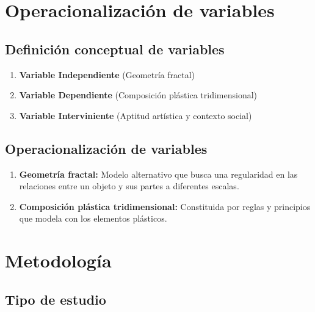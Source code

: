 \documentclass[12pt,]{report}
\providecommand{\tightlist}{%
  \setlength{\itemsep}{0pt}\setlength{\parskip}{0pt}}
\begin{document}
\hypertarget{operacionalizaciuxf3n-de-variables}{%
\section{Operacionalización de variables}\label{operacionalizaciuxf3n-de-variables}}

\hypertarget{definiciuxf3n-conceptual-de-variables}{%
\subsection{Definición conceptual de variables}\label{definiciuxf3n-conceptual-de-variables}}

\begin{enumerate}
\def\labelenumi{\arabic{enumi}.}
\item
  \textbf{Variable Independiente} (Geometría fractal)
\item
  \textbf{Variable Dependiente} (Composición plástica tridimensional)
\item
  \textbf{Variable Interviniente} (Aptitud artística y contexto social)
\end{enumerate}

\hypertarget{operacionalizaciuxf3n-de-variables-1}{%
\subsection{Operacionalización de variables}\label{operacionalizaciuxf3n-de-variables-1}}

\begin{enumerate}
\def\labelenumi{\arabic{enumi}.}
\tightlist
\item
  \textbf{Geometría fractal:} Modelo
  alternativo que busca una regularidad en las relaciones entre un objeto y sus
  partes a diferentes escalas.
\item
  \textbf{Composición plástica tridimensional:} Constituida por reglas y principios que modela con los elementos plásticos.
\end{enumerate}

\hypertarget{metodologuxeda}{%
\section{Metodología}\label{metodologuxeda}}

\hypertarget{tipo-de-estudio}{%
\subsection{Tipo de estudio}\label{tipo-de-estudio}}
\end{document}
